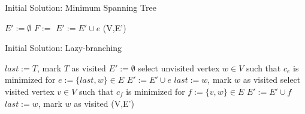 \begin{frame}{Initial Solution: Minimum Spanning Tree}
  \centering
  \footnotesize
  \begin{algorithm}[H]
    \caption{Prim's Algorithm with additional intersecting-constraint.}
    \begin{algorithmic}[1]
      \State $E':=\emptyset$
      \label{while-loop}
      \State $F:=$ 
      \State $E' := E' \cup e$
      \State {}
      \EndIf
      \EndFor
      \EndWhile
      \State \Return (V,E')
      \EndFunction
    \end{algorithmic}
  \end{algorithm}
\end{frame}
\begin{frame}{Initial Solution: Lazy-branching}
\begin{algorithm}[H]
  \footnotesize
  \caption{\footnotesize Hybrid algorithm that computes a spanning tree by extending paths greedily as possible. Otherwise we branch off and install switches.}
  \begin{algorithmic}[1]
    \State $last := T$, mark $T$ as visited 
    \State $E' := \emptyset$
      \State select unvisited vertex $w\in V$ such that $c_e$ is minimized for $e:=\{last,w\}\in E$
        \Comment{\textcolor{red}{Path}}
        \State $E' := E' \cup e$
        \State $last := w$, mark $w$ as visited
      \Else
        \Comment{\textcolor{red}{Branching}}
        \State select visited vertex $v\in V$ such that $c_f$ is minimized for $f:=\{v,w\}\in E$
        \State $E' := E' \cup f$
        \State $last := w$, mark $w$ as visited
      \EndIf
    \EndWhile
    \State \Return (V,E')
    \EndFunction
  \end{algorithmic}
\end{algorithm}
\end{frame}
